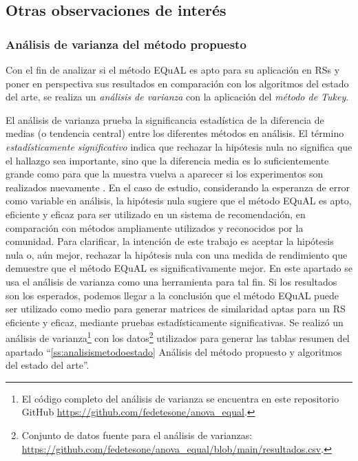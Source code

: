 \subsection{Otras observaciones de interés}

\subsubsection{Análisis de varianza del método propuesto}

Con el fin de analizar si el método EQuAL es apto para su aplicación en RSs y poner en perspectiva sus resultados en comparación con los algoritmos del estado del arte, se realiza un \textit{análisis de varianza} con la aplicación del \textit{método de Tukey}.

\bigskip El análisis de varianza prueba la significancia estadística de la diferencia de medias (o tendencia central) entre los diferentes métodos en análisis. El término\textit{ estadísticamente significativo} indica que rechazar la hipótesis nula no significa que el hallazgo sea importante, sino que la diferencia media es lo suficientemente grande como para que la muestra vuelva a aparecer si los experimentos son realizados nuevamente \citep{tabachnick2007experimental}. En el caso de estudio, considerando la esperanza de error como variable en análisis, la hipótesis nula sugiere que el método EQuAL es apto, eficiente y eficaz para ser utilizado en un sistema de recomendación, en comparación con métodos ampliamente utilizados y reconocidos por la comunidad. Para clarificar, la intención de este trabajo es aceptar la hipótesis nula o, aún mejor, rechazar la hipótesis nula con una medida de rendimiento que demuestre que el método EQuAL es significativamente mejor. En este apartado se usa el análisis de varianza como una herramienta para tal fin. Si los resultados son los esperados, podemos llegar a la conclusión que el método EQuAL puede ser utilizado como medio para generar matrices de similaridad aptas para un RS eficiente y eficaz, mediante pruebas estadísticamente significativas. Se realizó un análisis de varianza\footnote{El código completo del análisis de varianza se encuentra en este repositorio GitHub \url{https://github.com/fedetesone/anova_equal}.} con los datos\footnote{Conjunto de datos fuente para el análisis de varianzas: \url{https://github.com/fedetesone/anova_equal/blob/main/resultados.csv}.} utilizados para generar las tablas resumen del apartado “\ref{ss:analisismetodoestado} Análisis del método propuesto y algoritmos del estado del arte”.


